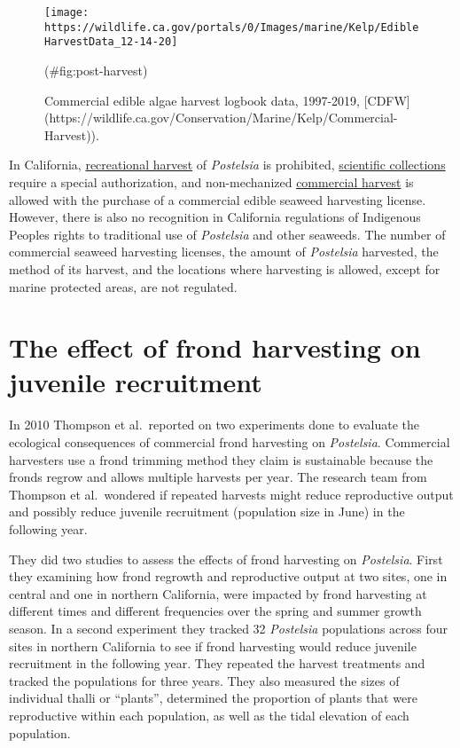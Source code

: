 \documentclass[
]{article}
\begin{document}
\begin{figure}

\texttt{[image: https://wildlife.ca.gov/portals/0/Images/marine/Kelp/EdibleHarvestData\_12-14-20]} \hfill{}

\caption{Commercial edible algae harvest logbook data, 1997-2019, [CDFW](https://wildlife.ca.gov/Conservation/Marine/Kelp/Commercial-Harvest)).}(\#fig:post-harvest)
\end{figure}

In California, \href{https://wildlife.ca.gov/Conservation/Marine/Kelp/Recreational-Harvest}{recreational harvest} of \emph{Postelsia} is prohibited, \href{https://wildlife.ca.gov/Licensing/Scientific-Collecting}{scientific collections} require a special authorization, and non-mechanized \href{https://wildlife.ca.gov/Conservation/Marine/Kelp/Commercial-Harvest}{commercial harvest} is allowed with the purchase of a commercial edible seaweed harvesting license. However, there is also no recognition in California regulations of Indigenous Peoples rights to traditional use of \emph{Postelsia} and other seaweeds. The number of commercial seaweed harvesting licenses, the amount of \emph{Postelsia} harvested, the method of its harvest, and the locations where harvesting is allowed, except for marine protected areas, are not regulated.

\newpage

\hypertarget{the-effect-of-frond-harvesting-on-juvenile-recruitment}{%
\section{The effect of frond harvesting on juvenile recruitment}\label{the-effect-of-frond-harvesting-on-juvenile-recruitment}}

In 2010 Thompson et al.~reported on two experiments done to evaluate the ecological consequences of commercial frond harvesting on \emph{Postelsia}. Commercial harvesters use a frond trimming method they claim is sustainable because the fronds regrow and allows multiple harvests per year. The research team from Thompson et al.~wondered if repeated harvests might reduce reproductive output and possibly reduce juvenile recruitment (population size in June) in the following year.

They did two studies to assess the effects of frond harvesting on \emph{Postelsia}. First they examining how frond regrowth and reproductive output at two sites, one in central and one in northern California, were impacted by frond harvesting at different times and different frequencies over the spring and summer growth season. In a second experiment they tracked 32 \emph{Postelsia} populations across four sites in northern California to see if frond harvesting would reduce juvenile recruitment in the following year. They repeated the harvest treatments and tracked the populations for three years. They also measured the sizes of individual thalli or ``plants'', determined the proportion of plants that were reproductive within each population, as well as the tidal elevation of each population.
\end{document}
